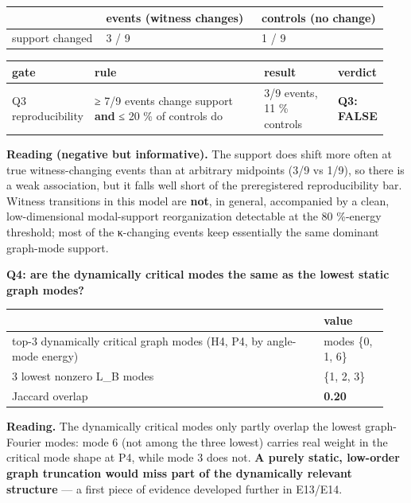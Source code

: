\documentclass[10pt,a4paper]{article}
\begin{document}
{\small
\begin{longtable}{L{0.239\linewidth}L{0.382\linewidth}L{0.319\linewidth}}
\toprule
\textbf{} & \textbf{events (witness changes)} & \textbf{controls (no change)} \\
\midrule
\endhead
support changed & 3 / 9 & 1 / 9 \\
\bottomrule
\end{longtable}}
{\small
\begin{longtable}{L{0.150\linewidth}L{0.474\linewidth}L{0.208\linewidth}L{0.108\linewidth}}
\toprule
\textbf{gate} & \textbf{rule} & \textbf{result} & \textbf{verdict} \\
\midrule
\endhead
Q3 reproducibility & ≥ 7/9 events change support \textbf{and} ≤ 20 \% of controls do & 3/9 events, 11 \% controls & \textbf{Q3: FALSE} \\
\bottomrule
\end{longtable}}
\textbf{Reading (negative but informative).} The support does shift more often at true witness-changing events than at arbitrary midpoints (3/9 vs 1/9), so there is a weak association, but it falls well short of the preregistered reproducibility bar. Witness transitions in this model are \textbf{not}, in general, accompanied by a clean, low-dimensional modal-support reorganization detectable at the 80 \%-energy threshold; most of the κ-changing events keep essentially the same dominant graph-mode support.

\textbf{Q4: are the dynamically critical modes the same as the lowest static graph modes?}

{\small
\begin{longtable}{L{0.772\linewidth}L{0.168\linewidth}}
\toprule
\textbf{} & \textbf{value} \\
\midrule
\endhead
top-3 dynamically critical graph modes (H4, P4, by angle-mode energy) & modes \{0, 1, 6\} \\
3 lowest nonzero L\_B modes & \{1, 2, 3\} \\
Jaccard overlap & \textbf{0.20} \\
\bottomrule
\end{longtable}}
\textbf{Reading.} The dynamically critical modes only partly overlap the lowest graph-Fourier modes: mode 6 (not among the three lowest) carries real weight in the critical mode shape at P4, while mode 3 does not. \textbf{A purely static, low-order graph truncation would miss part of the dynamically relevant structure} — a first piece of evidence developed further in E13/E14.
\end{document}

